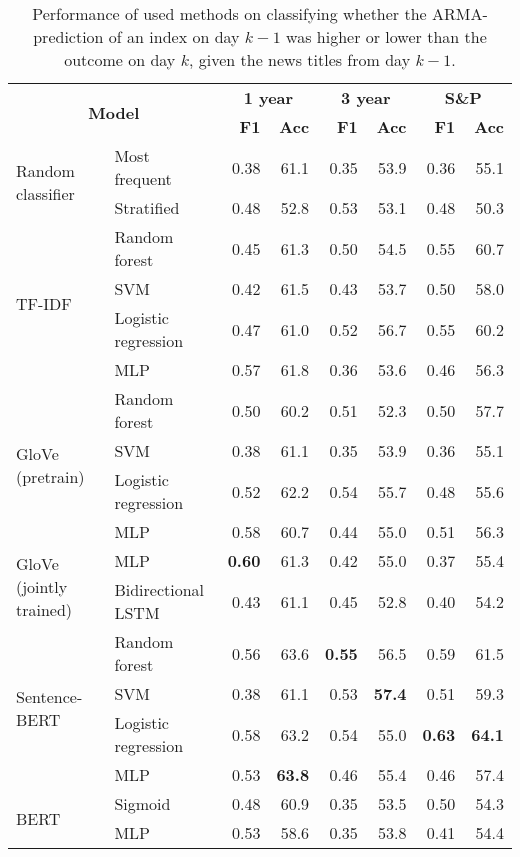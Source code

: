 \begin{table}[!htb]
    \centering
    \begin{tabular}{llrrrrrr}
    \hline
        \multicolumn{2}{c}{\multirow{2}{*}{\textbf{Model}}} & \multicolumn{2}{c}{\textbf{1 year}} & \multicolumn{2}{c}{\textbf{3 year}} & \multicolumn{2}{c}{\textbf{S\&P}} \\
      & & \textbf{F1} & \textbf{Acc} & \textbf{F1} & \textbf{Acc} & \textbf{F1} & \textbf{Acc} \\
        \hline \hline   
        \multirow{2}{*}{Random classifier} & Most frequent & 0.38 & 61.1 & 0.35 & 53.9 & 0.36 & 55.1 \\
        & Stratified & 0.48 & 52.8 & 0.53 & 53.1 & 0.48 & 50.3 \\
        \hline 
        \multirow{4}{*}{TF-IDF} & Random forest & 0.45 & 61.3 & 0.50 & 54.5 & 0.55 & 60.7 \\
        & SVM & 0.42 & 61.5 & 0.43 & 53.7 & 0.50 & 58.0 \\
        & Logistic regression & 0.47 & 61.0 & 0.52 & 56.7 & 0.55 & 60.2 \\
        & MLP & 0.57 & 61.8 & 0.36 & 53.6 & 0.46 & 56.3 \\
        \hline 
        \multirow{4}{*}{GloVe (pretrain)} & Random forest & 0.50 & 60.2 & 0.51 & 52.3 & 0.50 & 57.7 \\
        & SVM & 0.38 & 61.1 & 0.35 & 53.9 & 0.36 & 55.1 \\
        & Logistic regression & 0.52 & 62.2 & 0.54 & 55.7 & 0.48 & 55.6  \\
        & MLP & 0.58 & 60.7 & 0.44 & 55.0 & 0.51 & 56.3 \\
        \hline 
        \multirow{2}{*}{GloVe (jointly trained)} & MLP & \textbf{0.60} & 61.3 & 0.42 & 55.0 & 0.37 & 55.4 \\
        & Bidirectional LSTM & 0.43 & 61.1 & 0.45 & 52.8 & 0.40 & 54.2 \\
        \hline 
        \multirow{4}{*}{Sentence-BERT} & Random forest & 0.56 & 63.6 & \textbf{0.55} & 56.5 & 0.59 & 61.5 \\
        & SVM & 0.38 & 61.1 & 0.53 & \textbf{57.4} & 0.51 & 59.3 \\
        & Logistic regression & 0.58 & 63.2 & 0.54 & 55.0 & \textbf{0.63} & \textbf{64.1} \\
        & MLP & 0.53 & \textbf{63.8} & 0.46 & 55.4 & 0.46 & 57.4 \\
        \hline
        \multirow{2}{*}{BERT} & Sigmoid & 0.48 & 60.9 & 0.35 & 53.5 & 0.50 & 54.3  \\
        & MLP & 0.53 & 58.6 & 0.35 & 53.8 & 0.41 & 54.4 \\ 
        \hline
    \end{tabular}
\caption{Performance of used methods on classifying whether the ARMA-prediction of an index on day $k-1$ was higher or lower than the outcome on day $k$, given the news titles from day $k-1$.}
\label{tab:res_arma_ndp}
\end{table}

